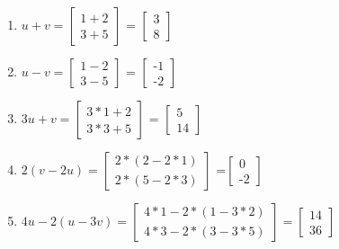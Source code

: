 \begin{enumerate}
\item $u+v = \begin{bmatrix} 1+2 \\ 3+5 \end{bmatrix}$ = $\begin{bmatrix} 3\\ 8 \end{bmatrix}$
\item $u-v = \begin{bmatrix}1-2 \\ 3-5 \end{bmatrix}$ = $\begin{bmatrix}\text{-}1 \\ \text{-}2 \end{bmatrix}$
\item $3u+v = \begin{bmatrix} 3*1 + 2 \\ 3*3 + 5\end{bmatrix}$ = $\begin{bmatrix} 5 \\ 14\end{bmatrix}$
\item $2(v-2u) =\begin{bmatrix} 2*(2-2*1) \\ 2*(5-2*3)\end{bmatrix}$ =$\begin{bmatrix} 0 \\ \text{-}2\end{bmatrix}$
\item $4u-2(u-3v) = \begin{bmatrix}4*1-2*(1-3*2) \\ 4*3-2*(3-3*5)\end{bmatrix} = \begin{bmatrix}14\\ 36\end{bmatrix}$
\end{enumerate}
